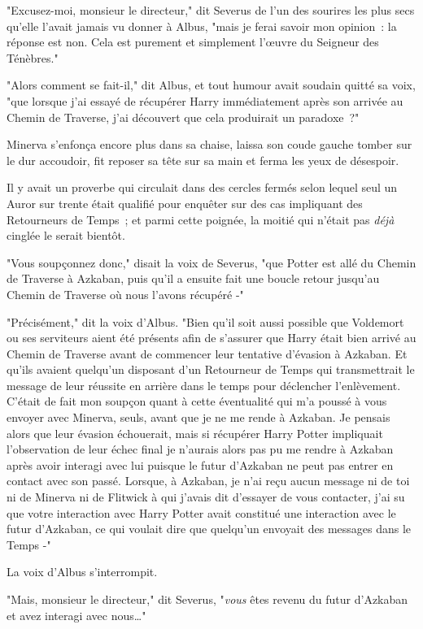"Excusez-moi, monsieur le directeur," dit Severus de l'un des sourires les plus secs qu'elle l'avait jamais vu donner à Albus, "mais je ferai savoir mon opinion~: la réponse est non. Cela est purement et simplement l'œuvre du Seigneur des Ténèbres."

"Alors comment se fait-il," dit Albus, et tout humour avait soudain quitté sa voix, "que lorsque j'ai essayé de récupérer Harry immédiatement après son arrivée au Chemin de Traverse, j'ai découvert que cela produirait un paradoxe~?"

Minerva s'enfonça encore plus dans sa chaise, laissa son coude gauche tomber sur le dur accoudoir, fit reposer sa tête sur sa main et ferma les yeux de désespoir.

Il y avait un proverbe qui circulait dans des cercles fermés selon lequel seul un Auror sur trente était qualifié pour enquêter sur des cas impliquant des Retourneurs de Temps~; et parmi cette poignée, la moitié qui n'était pas \emph{déjà} cinglée le serait bientôt.

"Vous soupçonnez donc," disait la voix de Severus, "que Potter est allé du Chemin de Traverse à Azkaban, puis qu'il a ensuite fait une boucle retour jusqu'au Chemin de Traverse où nous l'avons récupéré -"

"Précisément," dit la voix d'Albus. "Bien qu'il soit aussi possible que Voldemort ou ses serviteurs aient été présents afin de s'assurer que Harry était bien arrivé au Chemin de Traverse avant de commencer leur tentative d'évasion à Azkaban. Et qu'ils avaient quelqu'un disposant d'un Retourneur de Temps qui transmettrait le message de leur réussite en arrière dans le temps pour déclencher l'enlèvement. C'était de fait mon soupçon quant à cette éventualité qui m'a poussé à vous envoyer avec Minerva, seuls, avant que je ne me rende à Azkaban. Je pensais alors que leur évasion échouerait, mais si récupérer Harry Potter impliquait l'observation de leur échec final je n'aurais alors pas pu me rendre à Azkaban après avoir interagi avec lui puisque le futur d'Azkaban ne peut pas entrer en contact avec son passé. Lorsque, à Azkaban, je n'ai reçu aucun message ni de toi ni de Minerva ni de Flitwick à qui j'avais dit d'essayer de vous contacter, j'ai su que votre interaction avec Harry Potter avait constitué une interaction avec le futur d'Azkaban, ce qui voulait dire que quelqu'un envoyait des messages dans le Temps -"

La voix d'Albus s'interrompit.

"Mais, monsieur le directeur," dit Severus, "\emph{vous} êtes revenu du futur d'Azkaban et avez interagi avec nous…"

